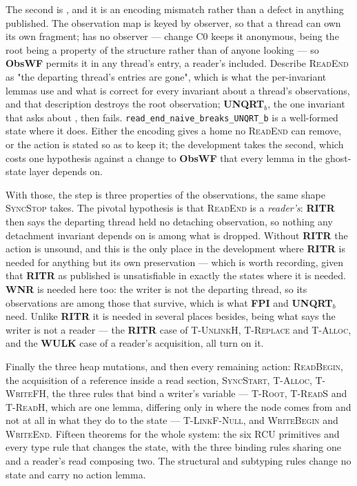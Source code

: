 The second is \rt{}, and it is an encoding mismatch rather than a defect in
anything published.  The observation map is keyed by observer, so that a thread
can own its own fragment; \rt{} has no observer --- change C0 keeps it
anonymous, being the root being a property of the structure rather than of
anyone looking --- so \textbf{ObsWF} permits it in any thread's entry, a
reader's included.  Describe \textsc{ReadEnd} as "the departing thread's entries
are gone", which is what the per-invariant lemmas use and what is correct for
every invariant about a thread's observations, and that description destroys
the root observation; \textbf{UNQRT}$_b$, the one invariant that asks about
\rt{}, then fails.  \texttt{read\_end\_naive\_breaks\_UNQRT\_b} is a well-formed
state where it does.  Either the encoding gives \rt{} a home no
\textsc{ReadEnd} can remove, or the action is stated so as to keep it; the
development takes the second, which costs one hypothesis against a change to
\textbf{ObsWF} that every lemma in the ghost-state layer depends on.

With those, the step is three properties of the observations, the same shape
\textsc{SyncStop} takes.  The pivotal hypothesis is that \textsc{ReadEnd} is a
\emph{reader's}: \textbf{RITR} then says the departing thread held no
detaching observation, so nothing any detachment invariant depends on is among
what is dropped.  Without \textbf{RITR} the action is unsound, and this is the
only place in the development where \textbf{RITR} is needed for anything but
its own preservation --- which is worth recording, given that \textbf{RITR} as
published is unsatisfiable in exactly the states where it is needed.
\textbf{WNR} is needed here too: the writer is not the departing thread, so its
\itr{} observations are among those that survive, which is what \textbf{FPI}
and \textbf{UNQRT}$_b$ need.  Unlike \textbf{RITR} it is needed in several
places besides, being what says the writer is not a reader --- the \textbf{RITR}
case of \textsc{T-UnlinkH}, \textsc{T-Replace} and \textsc{T-Alloc}, and the
\textbf{WULK} case of a reader's acquisition, all turn on it.

Finally the three heap mutations, and then every remaining action:
\textsc{ReadBegin}, the acquisition of a reference inside a read section,
\textsc{SyncStart}, \textsc{T-Alloc}, \textsc{T-WriteFH}, the three rules that
bind a writer's variable --- \textsc{T-Root}, \textsc{T-ReadS} and
\textsc{T-ReadH}, which are one lemma, differing only in where the node comes
from and not at all in what they do to the state --- \textsc{T-LinkF-Null}, and
\textsc{WriteBegin} and \textsc{WriteEnd}.  Fifteen theorems for the whole
system: the six RCU primitives and every type rule that changes the state, with
the three binding rules sharing one and a reader's read composing two.  The
structural and subtyping rules change no state and carry no action lemma.

